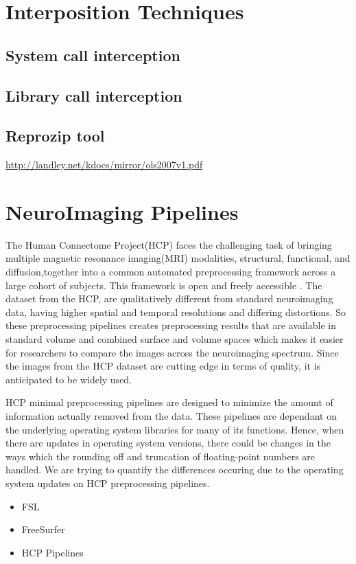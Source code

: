 \section{Interposition Techniques}
\subsection{System call interception}
\subsection{Library call interception}
\subsection{Reprozip tool}
\hyperref[System Call Interception]{http://landley.net/kdocs/mirror/ols2007v1.pdf}

\section{NeuroImaging Pipelines}
The Human Connectome Project(HCP) faces the challenging task of bringing multiple magnetic resonance imaging(MRI) modalities, structural, functional, and diffusion,together into a common automated preprocessing framework across a large cohort of subjects. This framework is open and freely accessible \cite{Gla13}. The dataset from the HCP, are qualitatively different from standard neuroimaging data, having higher spatial and temporal resolutions and differing distortions. So these preprocessing pipelines creates preprocessing results that are available in standard volume and combined surface and volume spaces which makes it easier for researchers to compare the images across the neuroimaging spectrum. Since the images from the HCP dataset are cutting edge in terms of quality, it is anticipated to be widely used.

HCP minimal preprocessing pipelines are designed to minimize the amount of information actually removed from the data. These pipelines are dependant on the underlying operating system libraries for many of its functions. Hence, when there are updates in operating system versions, there could be changes in the ways which the rounding off and truncation of floating-point numbers are handled. We are trying to quantify the differences occuring due to the operating system updates on HCP preprocessing pipelines.

\begin{itemize}
 \item FSL
 \item FreeSurfer
 \item HCP Pipelines
\end{itemize}


